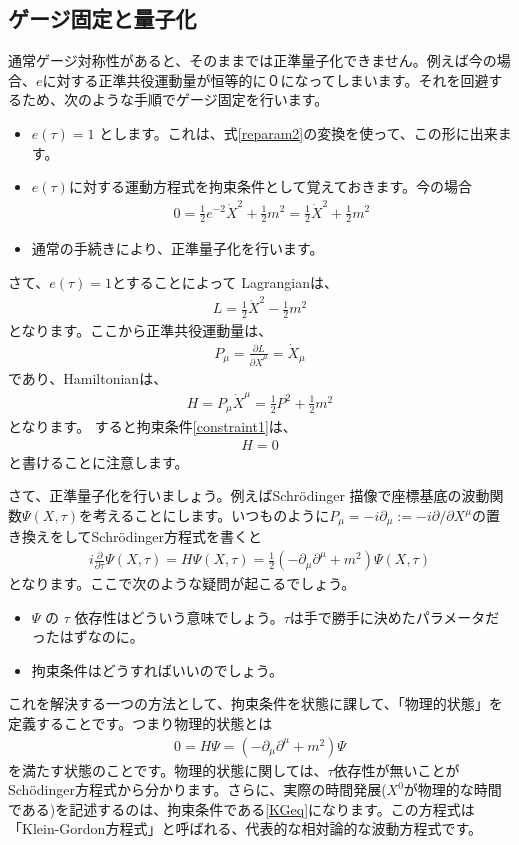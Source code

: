 \documentclass[report,paper=a4, fontsize=12pt, line_length=16cm, number_of_lines=33,dvipdfmx]{jlreq}
\numberwithin{equation}{chapter}
\numberwithin{equation}{section}
\newcommand{\del}{\partial}
\begin{document}
\subsection{ゲージ固定と量子化}
通常ゲージ対称性があると、そのままでは正準量子化できません。例えば今の場合、$e$に対する正準共役運動量が恒等的に０になってしまいます。それを回避するため、次のような手順でゲージ固定を行います。
\begin{itemize}
 \item $e(\tau)=1$ とします。これは、式\eqref{reparam2}の変換を使って、この形に出来ます。
 \item $e(\tau)$に対する運動方程式を拘束条件として覚えておきます。今の場合
\begin{align}
 0=\frac12 e^{-2}\dot{X}^2+\frac12 m^2=\frac12 \dot{X}^2+\frac12 m^2 \label{constraint1}
\end{align}
 \item 通常の手続きにより、正準量子化を行います。
\end{itemize}
さて、$e(\tau)=1$とすることによって Lagrangianは、
\begin{align}
 L=\frac12 \dot{X}^2-\frac12 m^2
\end{align}
となります。ここから正準共役運動量は、
\begin{align}
 P_{\mu}=\frac{\del L}{\del \dot{X}^{\mu}}=\dot{X}_{\mu}
\end{align}
であり、Hamiltonianは、
\begin{align}
 H=P_{\mu}\dot{X}^{\mu}=\frac12 P^2+\frac12 m^2
\end{align}
となります。 すると拘束条件\eqref{constraint1}は、
\begin{align}
 H=0
\end{align}
と書けることに注意します。

さて、正準量子化を行いましょう。例えばSchr\"odinger 描像で座標基底の波動関数$\Psi(X,\tau)$を考えることにします。いつものように$P_{\mu}=-i\del_{\mu}:=-i\del/\del X^{\mu}$の置き換えをしてSchr\"odinger方程式を書くと
\begin{align}
 i\frac{\del}{\del \tau}\Psi(X,\tau)= H \Psi(X,\tau)=\frac12 (-\del_{\mu}\del^{\mu}+m^2)\Psi(X,\tau)
\end{align}
となります。ここで次のような疑問が起こるでしょう。
\begin{itemize}
 \item $\Psi$ の $\tau$ 依存性はどういう意味でしょう。$\tau$は手で勝手に決めたパラメータだったはずなのに。
 \item 拘束条件はどうすればいいのでしょう。
\end{itemize}
これを解決する一つの方法として、拘束条件を状態に課して、「物理的状態」を定義することです。つまり物理的状態とは
\begin{align}
 0=H\Psi=(-\del_{\mu}\del^{\mu}+m^2)\Psi \label{KGeq}
\end{align}
を満たす状態のことです。物理的状態に関しては、$\tau$依存性が無いことがSch\"odinger方程式から分かります。さらに、実際の時間発展($X^0$が物理的な時間である)を記述するのは、拘束条件である\eqref{KGeq}になります。この方程式は「Klein-Gordon方程式」と呼ばれる、代表的な相対論的な波動方程式です。
\end{document}
